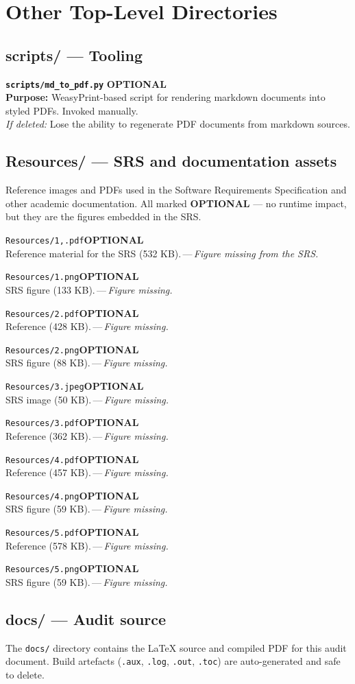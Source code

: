 \documentclass[10pt,a4paper]{article}
\newcommand{\optBadge}{\textcolor{zarAmber}{\textbf{OPTIONAL}}}
\newcommand{\fileEntry}[4]{%
  \par\noindent
  \begin{tcolorbox}[
    enhanced,
    breakable,
    colback=zarPaleGreen,
    colframe=zarMidGreen,
    arc=1pt,
    boxrule=0.4pt,
    left=6pt, right=6pt, top=3pt, bottom=3pt,
    fontupper=\small,
    before skip=2pt, after skip=4pt,
  ]
  \texttt{\textbf{#1}} \hfill {\small #2}\\[1pt]
  {\footnotesize\textbf{Purpose:} #3}\\[1pt]
  {\footnotesize\textit{If deleted:} #4}
  \end{tcolorbox}
}
\newcommand{\fileRow}[4]{%
  \par\noindent\texttt{\small #1}\hfill #2\\
  {\footnotesize\color{zarGray}#3\,---\,\textit{#4}}\\[2pt]
}
\begin{document}
\newpage

\section{Other Top-Level Directories}

\subsection{scripts/ — Tooling}

\fileEntry{scripts/md\_to\_pdf.py}{\optBadge}{WeasyPrint-based script for rendering markdown documents into styled PDFs. Invoked manually.}{Lose the ability to regenerate PDF documents from markdown sources.}

\subsection{Resources/ — SRS and documentation assets}

Reference images and PDFs used in the Software Requirements
Specification and other academic documentation. All marked
\optBadge{} --- no runtime impact, but they are the figures embedded
in the SRS.

\fileRow{Resources/1,.pdf}{\optBadge}{Reference material for the SRS (532 KB).}{Figure missing from the SRS.}
\fileRow{Resources/1.png}{\optBadge}{SRS figure (133 KB).}{Figure missing.}
\fileRow{Resources/2.pdf}{\optBadge}{Reference (428 KB).}{Figure missing.}
\fileRow{Resources/2.png}{\optBadge}{SRS figure (88 KB).}{Figure missing.}
\fileRow{Resources/3.jpeg}{\optBadge}{SRS image (50 KB).}{Figure missing.}
\fileRow{Resources/3.pdf}{\optBadge}{Reference (362 KB).}{Figure missing.}
\fileRow{Resources/4.pdf}{\optBadge}{Reference (457 KB).}{Figure missing.}
\fileRow{Resources/4.png}{\optBadge}{SRS figure (59 KB).}{Figure missing.}
\fileRow{Resources/5.pdf}{\optBadge}{Reference (578 KB).}{Figure missing.}
\fileRow{Resources/5.png}{\optBadge}{SRS figure (59 KB).}{Figure missing.}

\subsection{docs/ — Audit source}

The \texttt{docs/} directory contains the LaTeX source and compiled PDF
for this audit document. Build artefacts (\texttt{.aux}, \texttt{.log},
\texttt{.out}, \texttt{.toc}) are auto-generated and safe to delete.
\end{document}
